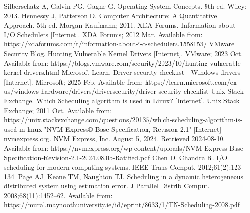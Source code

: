 \documentclass[a4paper]{article}
\begin{document}
\begin{thebibliography}{9}
    Silberschatz A, Galvin PG, Gagne G. Operating System Concepts. 9th ed. Wiley; 2013.
    Hennessy J, Patterson D. Computer Architecture: A Quantitative Approach. 5th ed. Morgan Kaufmann; 2011.
    XDA Forums. Information about I/O Schedulers [Internet]. XDA Forums; 2012 Mar. Available from: https://xdaforums.com/t/information-about-i-o-schedulers.1558153/
    VMware Security Blog. Hunting Vulnerable Kernel Drivers [Internet]. 
    VMware; 2023 Oct. Available from: 
    https://blogs.vmware.com/security/2023/10/hunting-vulnerable-kernel-drivers.html
    Microsoft Learn. Driver security checklist - Windows drivers [Internet]. Microsoft; 2025 Feb. Available from: https://learn.microsoft.com/en-us/windows-hardware/drivers/driversecurity/driver-security-checklist
    Unix Stack Exchange. Which Scheduling algorithm is used in Linux? [Internet]. Unix Stack Exchange; 2011 Oct. Available from: https://unix.stackexchange.com/questions/20135/which-scheduling-algorithm-is-used-in-linux
    "NVM Express® Base Specification, Revision 2.1" [Internet] nvmexpress.org. NVM Express, Inc. August 5, 2024. Retrieved 2024-08-10. Available from: https://nvmexpress.org/wp-content/uploads/NVM-Express-Base-Specification-Revision-2.1-2024.08.05-Ratified.pdf
    Chen D, Chandra R. I/O scheduling for modern computing systems. IEEE Trans Comput. 2012;61(2):123-134.
    Page AJ, Keane TM, Naughton TJ. Scheduling in a dynamic heterogeneous distributed system using estimation error. J Parallel Distrib Comput. 2008;68(11):1452–62. Available from: https://mural.maynoothuniversity.ie/id/eprint/8633/1/TN-Scheduling-2008.pdf
\end{thebibliography}
\end{document}
